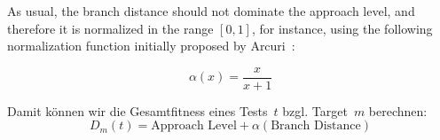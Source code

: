 \documentclass{article}
\begin{document}
As usual, the branch distance should not dominate the approach level, and therefore it is normalized in the range $[0, 1]$, for instance, using the following normalization function initially proposed by Arcuri~\cite{Arcuri_2011}:

\[\alpha(x) = \frac{x}{x + 1}\]

Damit können wir die Gesamtfitness eines Tests~$t$ bzgl. Target~$m$ berechnen:
\[D_m(t) = \text{Approach Level} + \alpha(\text{Branch Distance})\]


\end{document}
